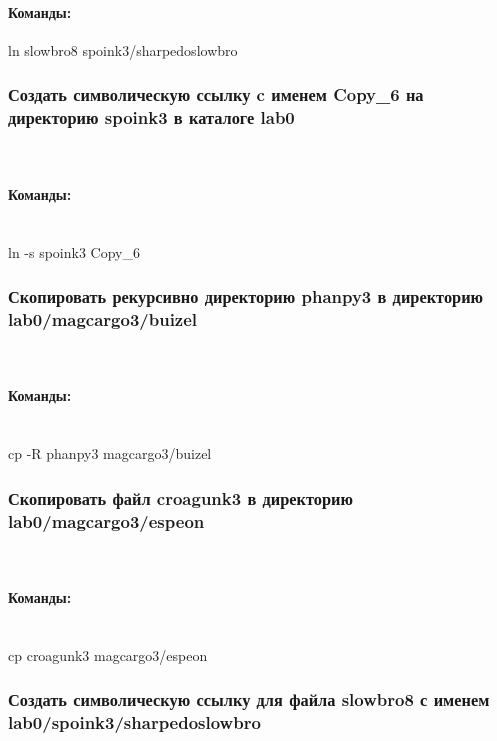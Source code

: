 \documentclass[12pt,onecolumn]{article}
\begin{document}
\paragraph{Команды:}
ln slowbro8 spoink3/sharpedoslowbro
\subsubsection {Создать символическую ссылку c именем Copy\_6 на директорию spoink3 в каталоге lab0}\\

\paragraph{Команды:}\\
ln -s spoink3 Copy\_6

\subsubsection {Скопировать рекурсивно директорию phanpy3 в директорию\\ lab0/magcargo3/buizel}\\

\paragraph{Команды:}\\

cp -R phanpy3 magcargo3/buizel

\subsubsection {Скопировать файл croagunk3 в директорию lab0/magcargo3/espeon}\\

\paragraph{Команды:}\\

cp croagunk3 magcargo3/espeon

\subsubsection{Создать символическую ссылку для файла slowbro8 с именем\\ lab0/spoink3/sharpedoslowbro}\\
\end{document}
